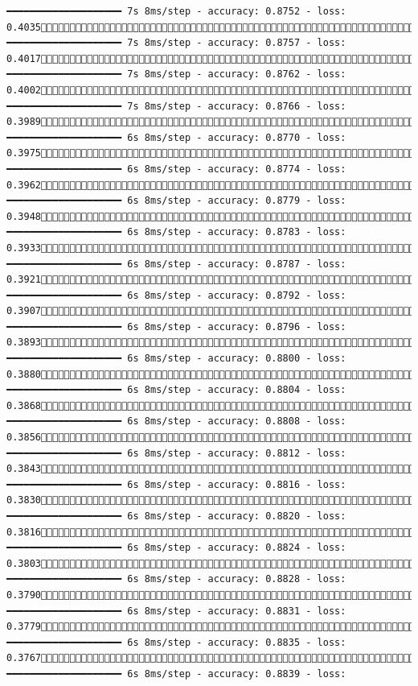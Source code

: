 \documentclass[
  letterpaper,
  DIV=11,
  numbers=noendperiod]{scrreprt}
\begin{document}
\begin{verbatim}
━━━━━━━━━━━━━━━━━━━━ 7s 8ms/step - accuracy: 0.8752 - loss: 0.40351009/1875 ━━━━━━━━━━━━━━━━━━━━ 7s 8ms/step - accuracy: 0.8757 - loss: 0.40171016/1875 ━━━━━━━━━━━━━━━━━━━━ 7s 8ms/step - accuracy: 0.8762 - loss: 0.40021022/1875 ━━━━━━━━━━━━━━━━━━━━ 7s 8ms/step - accuracy: 0.8766 - loss: 0.39891029/1875 ━━━━━━━━━━━━━━━━━━━━ 6s 8ms/step - accuracy: 0.8770 - loss: 0.39751035/1875 ━━━━━━━━━━━━━━━━━━━━ 6s 8ms/step - accuracy: 0.8774 - loss: 0.39621042/1875 ━━━━━━━━━━━━━━━━━━━━ 6s 8ms/step - accuracy: 0.8779 - loss: 0.39481049/1875 ━━━━━━━━━━━━━━━━━━━━ 6s 8ms/step - accuracy: 0.8783 - loss: 0.39331055/1875 ━━━━━━━━━━━━━━━━━━━━ 6s 8ms/step - accuracy: 0.8787 - loss: 0.39211062/1875 ━━━━━━━━━━━━━━━━━━━━ 6s 8ms/step - accuracy: 0.8792 - loss: 0.39071069/1875 ━━━━━━━━━━━━━━━━━━━━ 6s 8ms/step - accuracy: 0.8796 - loss: 0.38931076/1875 ━━━━━━━━━━━━━━━━━━━━ 6s 8ms/step - accuracy: 0.8800 - loss: 0.38801082/1875 ━━━━━━━━━━━━━━━━━━━━ 6s 8ms/step - accuracy: 0.8804 - loss: 0.38681088/1875 ━━━━━━━━━━━━━━━━━━━━ 6s 8ms/step - accuracy: 0.8808 - loss: 0.38561095/1875 ━━━━━━━━━━━━━━━━━━━━ 6s 8ms/step - accuracy: 0.8812 - loss: 0.38431102/1875 ━━━━━━━━━━━━━━━━━━━━ 6s 8ms/step - accuracy: 0.8816 - loss: 0.38301109/1875 ━━━━━━━━━━━━━━━━━━━━ 6s 8ms/step - accuracy: 0.8820 - loss: 0.38161116/1875 ━━━━━━━━━━━━━━━━━━━━ 6s 8ms/step - accuracy: 0.8824 - loss: 0.38031123/1875 ━━━━━━━━━━━━━━━━━━━━ 6s 8ms/step - accuracy: 0.8828 - loss: 0.37901129/1875 ━━━━━━━━━━━━━━━━━━━━ 6s 8ms/step - accuracy: 0.8831 - loss: 0.37791136/1875 ━━━━━━━━━━━━━━━━━━━━ 6s 8ms/step - accuracy: 0.8835 - loss: 0.37671143/1875 ━━━━━━━━━━━━━━━━━━━━ 6s 8ms/step - accuracy: 0.8839 - loss: 
\end{verbatim}
\end{document}
